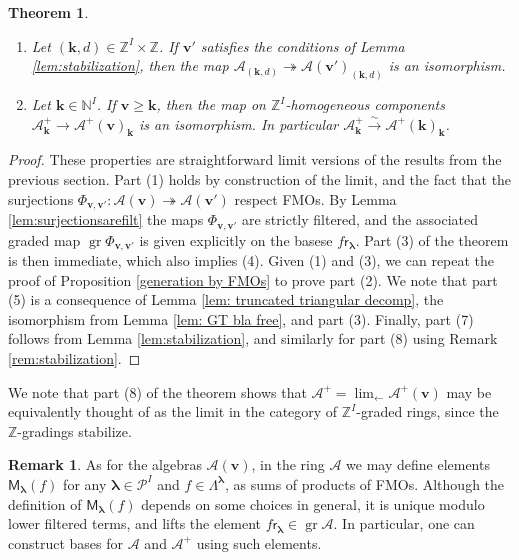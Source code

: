 \documentclass[11pt,reqno]{amsart}
\renewcommand{\mathbf}{\mathbold}
\numberwithin{equation}{section}
\newtheorem{Theorem}[equation]{Theorem}
\theoremstyle{definition}
\newtheorem{Remark}[equation]{Remark}
\newcommand{\cA}{\mathcal{A}}
\newcommand{\cP}{\mathcal{P}}
\newcommand{\bk}{\mathbf{k}}
\newcommand{\bv}{\mathbf{v}}
\newcommand{\NN}{\mathbb{N}}
\newcommand{\ZZ}{\mathbb{Z}}
\DeclareMathOperator{\gr}{gr}
\renewcommand{\bv}{\mathbf{v}} %
\newcommand{\M}{\mathsf{M}}
\newcommand{\sfr}{{\mathsf{r}}}
\newcommand{\vertexset}{I}
\newcommand{\GT}{\Lambda}
\newcommand{\Partitions}{\cP}
\newcommand{\bla}{{\boldsymbol{\lambda}}}
\newcommand{\qzast}{\cA}
\newcommand{\qzastplus}{\cA^{+}}
\begin{document}
\begin{Theorem}
\begin{enumerate}
        \item Let $(\bk, d) \in \ZZ^I \times \ZZ$.  If $\bv'$ satisfies the conditions of Lemma \ref{lem:stabilization}, then the map $\qzast_{(\bk,d)} \twoheadrightarrow \qzast(\bv')_{(\bk,d)}$ is an isomorphism.

        \item Let $\bk \in \NN^I$. If $\bv \geq \bk$, then the map on $\ZZ^\vertexset$-homogeneous components $\qzastplus_{\bk} \rightarrow \qzastplus(\bv)_{\bk}  $ is an isomorphism. In particular $\qzastplus_\bk \xrightarrow{\sim} \qzastplus(\bk)_\bk$.
    \end{enumerate}
\end{Theorem}
\begin{proof}
    These properties are straightforward limit versions of the results from the previous section.  Part (1) holds by construction of the limit, and the fact that the surjections $\Phi_{\bv,\bv'}: \qzast(\bv) \twoheadrightarrow \qzast(\bv')$ respect FMOs.  By Lemma \ref{lem:surjectionsarefilt}  the maps $\Phi_{\bv,\bv'}$ are strictly filtered, and the associated graded map $\gr \Phi_{\bv,\bv'}$ is given explicitly on the basese $f\sfr_\bla$.  Part (3) of the theorem is then immediate, which also implies (4). Given (1) and (3), we can repeat the proof of Proposition \ref{generation by FMOs} to prove part (2). We note that part (5) is a consequence of Lemma \ref{lem: truncated triangular decomp}, the isomorphism from Lemma \ref{lem: GT bla free}, and part (3). Finally, part (7) follows from Lemma \ref{lem:stabilization}, and similarly for part (8) using Remark \ref{rem:stabilization}.
\end{proof}


We note that part (8) of the theorem shows that $\qzastplus = \displaystyle{\lim_{\longleftarrow}} \qzastplus(\bv)$ may be equivalently thought of as the limit in the category of $\ZZ^\vertexset$-graded rings, since the $\ZZ$-gradings stabilize. 

\begin{Remark}
    \label{rem: limit monopole operators}
    As for the algebras $\qzast(\bv)$, in the ring $\qzast$ we may define elements $\M_\bla(f)$ for any $\bla \in \Partitions^\vertexset$ and $f \in \GT^\bla$, as sums of products of FMOs. Although the definition of $\M_\bla(f)$ depends on some choices in general, it is unique modulo lower filtered terms, and  lifts the element $f \sfr_\bla \in \gr \qzast$.  In particular, one can construct  bases for $\qzast$ and $\qzastplus$ using such elements.
\end{Remark}
\end{document}
